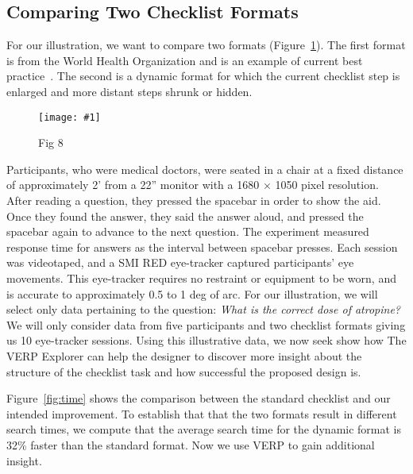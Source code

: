 \documentclass{sigchi}
\newcommand{\insertpicture}[2]{\begin{center}\texttt{[image: \#1]}\end{center}}
\begin{document}
\subsection{Comparing Two Checklist Formats} For our illustration, we want
to compare two formats (Figure~\ref{Fig8}). The first format is from the 
World Health Organization and is an example of current best
practice~\cite{James_2013}.  The second is a dynamic format for which 
the current checklist step is enlarged and more distant steps shrunk 
or hidden\cite{Cirimele_2014}.

\begin{figure}
\insertpicture{figures/dummy.eps}{0.5}
\caption{Fig 8 \label{Fig8}} 
\end{figure}


Participants, who were medical doctors, were seated in a chair at a fixed
distance of approximately 2' from a 22'' monitor with a 1680 × 1050 pixel
resolution. After reading a question, they pressed the spacebar in order to
show the aid. Once they found the answer, they said the answer aloud, and
pressed the spacebar again to advance to the next question. The experiment
measured response time for answers as the interval between spacebar
presses. Each session was videotaped, and a SMI RED eye-tracker captured
participants’ eye movements. This eye-tracker requires no restraint or
equipment to be worn, and is accurate to approximately 0.5 to 1 deg of arc.
For our illustration, we will select only data pertaining to the question:
\emph{What is the correct dose of atropine?} We will only consider data from
five participants and two checklist formats giving us 10 eye-tracker
sessions. Using this illustrative data, we now seek show how The VERP Explorer can help the designer to discover more
insight about the structure of the checklist task and how successful the
proposed design is. 

Figure~\ref{fig:time} shows the comparison between the standard
checklist and our intended improvement. To establish that that the two formats result in different search times, we compute that the average search time for the dynamic format
is 32\% faster than the standard format. Now we use VERP to gain additional insight.  
\end{document}
